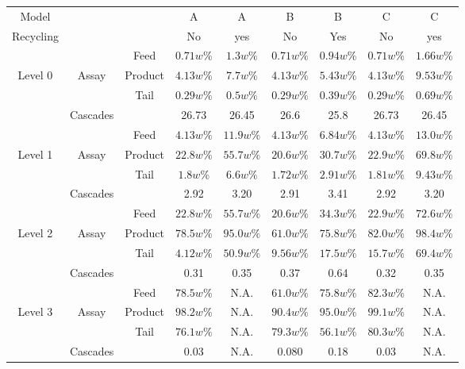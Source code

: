 \begin{table}[h!]
\begin{tabular}{ccccccccc}
Model       &        &           & A         & A         & B         & B       & C         & C          \\
Recycling   &        &           & No        & yes       & No        & Yes     & No        & yes        \\
\midrule                                                                                                 
        &            & Feed      & $0.71w\%$ & $1.3w\%$  & $0.71w\%$ & $0.94w\%$ & $0.71w\%$ & $1.66w\%$ \\
Level 0 & Assay      & Product   & $4.13w\%$ & $7.7w\%$  & $4.13w\%$ & $5.43w\%$ & $4.13w\%$ & $9.53w\%$ \\
        &            & Tail      & $0.29w\%$ & $0.5w\%$  & $0.29w\%$ & $0.39w\%$ & $0.29w\%$ & $0.69w\%$  \\
        & Cascades   &           & 26.73     & 26.45     & 26.6      & 25.8      & 26.73     & 26.45      \\
\midrule                                                                                                 
        &            & Feed      & $4.13w\%$ & $11.9w\%$ & $4.13w\%$ & $6.84w\%$ & $4.13w\%$ & $13.0w\%$ \\
Level 1 & Assay      & Product   & $22.8w\%$ & $55.7w\%$ & $20.6w\%$ & $30.7w\%$ & $22.9w\%$ & $69.8w\%$ \\
        &            & Tail      & $1.8w\%$  & $6.6w\%$  & $1.72w\%$ & $2.91w\%$ & $1.81w\%$ & $9.43w\%$  \\
        & Cascades   &           & 2.92       & 3.20      & 2.91      & 3.41     & 2.92      & 3.20       \\
\midrule                                                                                                 
        &            & Feed      & $22.8w\%$ & $55.7w\%$ & $20.6w\%$ & $34.3w\%$ & $22.9w\%$ & $72.6w\%$ \\
Level 2 & Assay      & Product   & $78.5w\%$ & $95.0w\%$ & $61.0w\%$ & $75.8w\%$ & $82.0w\%$ & $98.4w\%$ \\
        &            & Tail      & $4.12w\%$ & $50.9w\%$ & $9.56w\%$ & $17.5w\%$ & $15.7w\%$ & $69.4w\%$ \\
        & Cascades   &           & 0.31      & 0.35      & 0.37      & 0.64      & 0.32      & 0.35      \\
\midrule                                                                                                 
        &            & Feed      & $78.5w\%$ & N.A.      & $61.0w\%$ & $75.8w\%$ & $82.3w\%$ & N.A.      \\
Level 3 & Assay      & Product   & $98.2w\%$ & N.A.      & $90.4w\%$ & $95.0w\%$ & $99.1w\%$ & N.A.      \\
        &            & Tail      & $76.1w\%$ & N.A.      & $79.3w\%$ & $56.1w\%$ & $80.3w\%$ & N.A.      \\
        & Cascades   &           & 0.03      & N.A.      & 0.080     & 0.18      & 0.03      & N.A.      \\
\bottomrule
\end{tabular}
  \label{tab:level}
\end{table}


